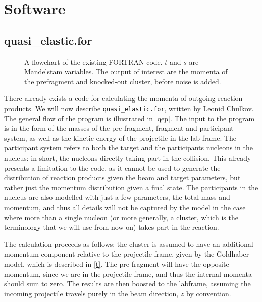 \documentclass[12pt, a4paper]{article}
\begin{document}
\clearpage


\section{Software}
\label{s}
\subsection{quasi\_elastic.for}
\begin{figure}
\begin{center}
\scalebox{0.8}{
\hspace{-10ex}}
\caption{\label{qep} A flowchart of the existing FORTRAN code. $t$ and $s$ are Mandelstam variables. The output of interest are the momenta of the prefragment and knocked-out cluster, before noise is added.}
\end{center}
\end{figure}
There already exists a code for calculating the momenta of outgoing reaction products. We will now describe \texttt{quasi\_elastic.for}, written by Leonid Chulkov. The general flow of the program is illustrated in \autoref{qep}.
The input to the program is in the form of the masses of the pre-fragment, fragment and participant system, as well as the kinetic energy of the projectile in the lab frame. The participant system refers to both the target and the participants nucleons in the nucleus: in short, the nucleons directly taking part in the collision.
This already presents a limitation to the code, as it cannot be used to generate the distribution of reaction products given the beam and target parameters, but rather just the momentum distribution given a final state. The participants in the nucleus are also modelled with just a few parameters, the total mass and momentum, and thus all details will not be captured by the model in the case where more than a single nucleon (or more generally, a cluster, which is the terminology that we will use from now on) takes part in the reaction.

The calculation proceeds as follows: the cluster is assumed to have an additional momentum component relative to the projectile frame, given by the Goldhaber model, which is described in \autoref{t}. The pre-fragment will have the opposite momentum, since we are in the projectile frame, and thus the internal momenta should sum to zero. The results are then boosted to the labframe, assuming the incoming projectile travels purely in the beam direction, $z$ by convention. 
\end{document}

